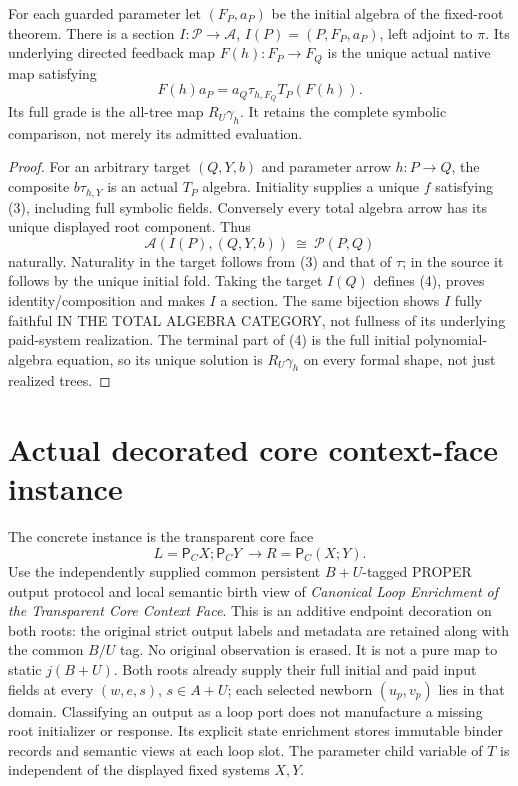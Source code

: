 \documentclass[11pt]{article}
\begin{document}
\begin{theorem}
For each guarded parameter let $(F_P,a_P)$ be the initial algebra of the fixed-root theorem. There is a section $I:\mathcal P\to\mathcal A$, $I(P)=(P,F_P,a_P)$, left adjoint to $\pi$. Its underlying directed feedback map $F(h):F_P\to F_Q$ is the unique actual native map satisfying
\[
 F(h)a_P=a_Q\tau_{h,F_Q}T_P(F(h)).                       \tag{4}
\]
Its full grade is the all-tree map $R_U\gamma_h$. It retains the complete symbolic comparison, not merely its admitted evaluation.
\end{theorem}
\begin{proof}
For an arbitrary target $(Q,Y,b)$ and parameter arrow $h:P\to Q$, the composite $b\tau_{h,Y}$ is an actual $T_P$ algebra. Initiality supplies a unique $f$ satisfying (3), including full symbolic fields. Conversely every total algebra arrow has its unique displayed root component. Thus
\[
 \mathcal A(I(P),(Q,Y,b))\ \cong\ \mathcal P(P,Q)
\]
naturally. Naturality in the target follows from (3) and that of $\tau$; in the source it follows by the unique initial fold. Taking the target $I(Q)$ defines (4), proves identity/composition and makes $I$ a section. The same bijection shows $I$ fully faithful IN THE TOTAL ALGEBRA CATEGORY, not fullness of its underlying paid-system realization. The terminal part of (4) is the full initial polynomial-algebra equation, so its unique solution is $R_U\gamma_h$ on every formal shape, not just realized trees.\end{proof}

\section{Actual decorated core context-face instance}
The concrete instance is the transparent core face
\[
 L=\mathsf P_CX;\mathsf P_CY\ \longrightarrow
 R=\mathsf P_C(X;Y).
\]
Use the independently supplied common persistent $B+U$-tagged PROPER output protocol and local semantic birth view of \emph{Canonical Loop Enrichment of the Transparent Core Context Face}. This is an additive endpoint decoration on both roots: the original strict output labels and metadata are retained along with the common $B/U$ tag. No original observation is erased. It is not a pure map to static $j(B+U)$. Both roots already supply their full initial and paid input fields at every $(w,e,s)$, $s\in A+U$; each selected newborn $(u_p,v_p)$ lies in that domain. Classifying an output as a loop port does not manufacture a missing root initializer or response. Its explicit state enrichment stores immutable binder records and semantic views at each loop slot. The parameter child variable of $T$ is independent of the displayed fixed systems $X,Y$.
\end{document}
